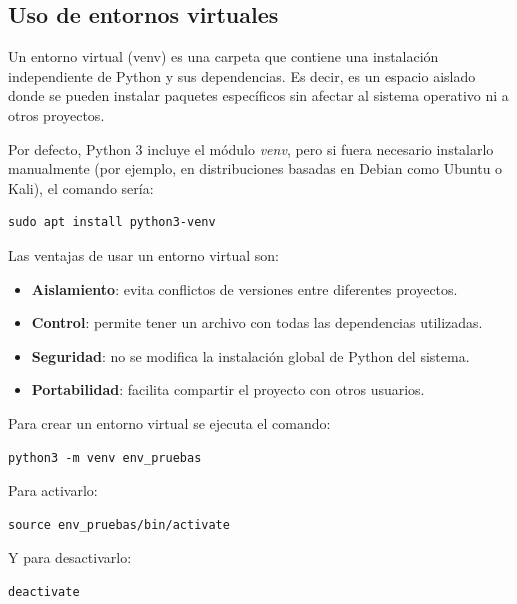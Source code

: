 \documentclass[10pt]{book}
\begin{document}
    \subsection{Uso de entornos virtuales} 
    
    \cite{venv_python}Un entorno virtual (venv) es una carpeta que contiene una instalación independiente de Python y sus dependencias. Es decir, es un espacio aislado donde se pueden instalar paquetes específicos sin afectar al sistema operativo ni a otros proyectos. 
    
    Por defecto, Python 3 incluye el módulo \textit{venv}, pero si fuera necesario instalarlo manualmente (por ejemplo, en distribuciones basadas en Debian como Ubuntu o Kali), el comando sería:
    
    \begin{lstlisting}[style=simplebash]
    sudo apt install python3-venv
    \end{lstlisting}
    
    Las ventajas de usar un entorno virtual son:
    
    \begin{itemize}
        \item \textbf{Aislamiento}: evita conflictos de versiones entre diferentes proyectos.
        \item \textbf{Control}: permite tener un archivo con todas las dependencias utilizadas.
        \item \textbf{Seguridad}: no se modifica la instalación global de Python del sistema.
        \item \textbf{Portabilidad}: facilita compartir el proyecto con otros usuarios.
    \end{itemize}
    
    Para crear un entorno virtual se ejecuta el comando:
    
    \begin{lstlisting}[style=simplebash]
    python3 -m venv env_pruebas
    \end{lstlisting}
    
    Para activarlo:
    
    \begin{lstlisting}[style=simplebash]
    source env_pruebas/bin/activate
    \end{lstlisting}
    
    Y para desactivarlo:
    
    \begin{lstlisting}[style=simplebash]
    deactivate
    \end{lstlisting}
    
\end{document}
